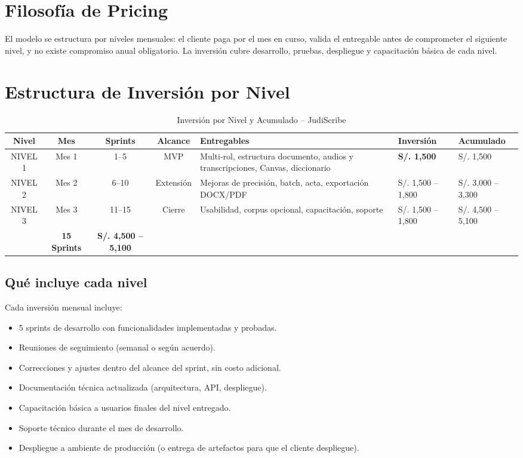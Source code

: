 \documentclass[12pt,a4paper]{report}
\begin{document}
\section{Filosofía de Pricing}

El modelo se estructura por niveles mensuales: el cliente paga por el mes en curso, valida el entregable antes de comprometer el siguiente nivel, y no existe compromiso anual obligatorio. La inversión cubre desarrollo, pruebas, despliegue y capacitación básica de cada nivel.

\section{Estructura de Inversión por Nivel}

\begin{table}[H]
\centering
\small
\begin{tabular}{|c|c|c|c|p{3.8cm}|p{2cm}|p{2.2cm}|}
\hline
\rowcolor{primaryblue!20}
\textbf{Nivel} & \textbf{Mes} & \textbf{Sprints} & \textbf{Alcance} & \textbf{Entregables} & \textbf{Inversión} & \textbf{Acumulado} \\
\hline
NIVEL 1 & Mes 1 & 1--5 & MVP & Multi-rol, estructura documento, audios y transcripciones, Canvas, diccionario & \textbf{S/. 1,500} & S/. 1,500 \\
\hline
NIVEL 2 & Mes 2 & 6--10 & Extensión & Mejoras de precisión, batch, acta, exportación DOCX/PDF & S/. 1,500 -- 1,800 & S/. 3,000 -- 3,300 \\
\hline
NIVEL 3 & Mes 3 & 11--15 & Cierre & Usabilidad, corpus opcional, capacitación, soporte & S/. 1,500 -- 1,800 & S/. 4,500 -- 5,100 \\
\hline
\rowcolor{secondarygreen!20}
\multicolumn{5}{|r|}{\textbf{TOTAL SISTEMA COMPLETO:}} & \textbf{15 Sprints} & \textbf{S/. 4,500 -- 5,100} \\
\hline
\end{tabular}
\caption{Inversión por Nivel y Acumulado -- JudiScribe}
\end{table}

\subsection{Qué incluye cada nivel}

Cada inversión mensual incluye:

\begin{itemize}
    \item 5 sprints de desarrollo con funcionalidades implementadas y probadas.
    \item Reuniones de seguimiento (semanal o según acuerdo).
    \item Correcciones y ajustes dentro del alcance del sprint, sin costo adicional.
    \item Documentación técnica actualizada (arquitectura, API, despliegue).
    \item Capacitación básica a usuarios finales del nivel entregado.
    \item Soporte técnico durante el mes de desarrollo.
    \item Despliegue a ambiente de producción (o entrega de artefactos para que el cliente despliegue).
\end{itemize}
\end{document}
